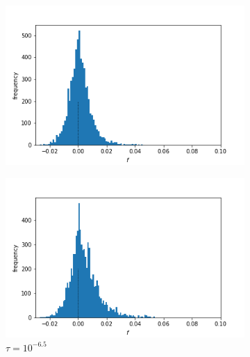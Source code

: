 \documentclass{article}
\begin{document}
\begin{figure}[h]
	\centering
	\begin{subfigure}[t]{0.24\linewidth}
		\centering
		\includegraphics[width = 1.0\linewidth, trim={0 0 0 0}, clip=true]{figures/tau5e7_selection_hist2.png}
		\label{fig:t7}	
	\end{subfigure}
	\hspace{0.01\linewidth}
	\begin{subfigure}[t]{0.24\linewidth}
		\centering
		\includegraphics[width = 1.0\linewidth, trim={0 0 0 0}, clip=true]{figures/tau5e5_selection_hist2.png}
		\caption{$\tau = 10^{-6.5}$}
		\label{fig:t65}
	\end{subfigure}
	\begin{subfigure}[t]{0.24\linewidth}
		\centering

\end{subfigure}
\end{figure}
\end{document}
